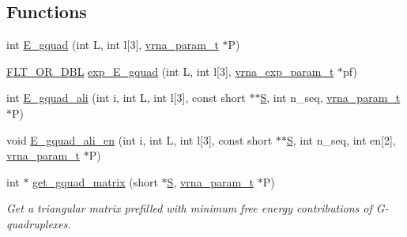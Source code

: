\subsection*{Functions}
\begin{DoxyCompactItemize}
\item 
int \mbox{\hyperlink{group__gquads_gaa6c187f30e29d3aa29c5b537d0f7293f}{E\+\_\+gquad}} (int L, int l\mbox{[}3\mbox{]}, \mbox{\hyperlink{group__energy__parameters_ga8a69ca7d787e4fd6079914f5343a1f35}{vrna\+\_\+param\+\_\+t}} $\ast$P)
\item 
\mbox{\hyperlink{group__data__structures_ga31125aeace516926bf7f251f759b6126}{F\+L\+T\+\_\+\+O\+R\+\_\+\+D\+BL}} \mbox{\hyperlink{group__gquads_ga4dbda5faf903ca987b296a7629764221}{exp\+\_\+\+E\+\_\+gquad}} (int L, int l\mbox{[}3\mbox{]}, \mbox{\hyperlink{group__energy__parameters_ga01d8b92fe734df8d79a6169482c7d8d8}{vrna\+\_\+exp\+\_\+param\+\_\+t}} $\ast$pf)
\item 
int \mbox{\hyperlink{group__gquads_gad6cd438e9e9bd37b57b361b8ce2fd51a}{E\+\_\+gquad\+\_\+ali}} (int i, int L, int l\mbox{[}3\mbox{]}, const short $\ast$$\ast$\mbox{\hyperlink{group__energy__parameters__rw_gga7bf2bb363bcf5ce50d60255d256e5682af1ce01387d2348f8b858721a7db81670}{S}}, int n\+\_\+seq, \mbox{\hyperlink{group__energy__parameters_ga8a69ca7d787e4fd6079914f5343a1f35}{vrna\+\_\+param\+\_\+t}} $\ast$P)
\item 
void \mbox{\hyperlink{group__gquads_ga106bfd11a4c7a12c4ded9b32d31e78e9}{E\+\_\+gquad\+\_\+ali\+\_\+en}} (int i, int L, int l\mbox{[}3\mbox{]}, const short $\ast$$\ast$\mbox{\hyperlink{group__energy__parameters__rw_gga7bf2bb363bcf5ce50d60255d256e5682af1ce01387d2348f8b858721a7db81670}{S}}, int n\+\_\+seq, int en\mbox{[}2\mbox{]}, \mbox{\hyperlink{group__energy__parameters_ga8a69ca7d787e4fd6079914f5343a1f35}{vrna\+\_\+param\+\_\+t}} $\ast$P)
\item 
int $\ast$ \mbox{\hyperlink{group__gquads_ga392e45c9615aa123737671603fa4203c}{get\+\_\+gquad\+\_\+matrix}} (short $\ast$\mbox{\hyperlink{group__energy__parameters__rw_gga7bf2bb363bcf5ce50d60255d256e5682af1ce01387d2348f8b858721a7db81670}{S}}, \mbox{\hyperlink{group__energy__parameters_ga8a69ca7d787e4fd6079914f5343a1f35}{vrna\+\_\+param\+\_\+t}} $\ast$P)
\begin{DoxyCompactList}\small\item\em Get a triangular matrix prefilled with minimum free energy contributions of G-\/quadruplexes. \end{DoxyCompactList}\item 

\end{DoxyCompactItemize}
